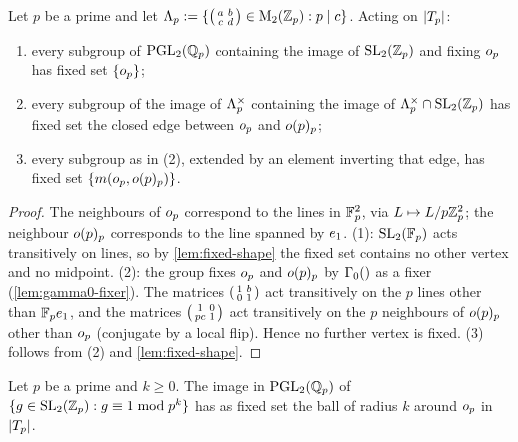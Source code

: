 \begin{lemma}
\label{lem:local-fixed-points}
Let $p$ be a prime and let $\Lambda_{p} := \{\left(\begin{smallmatrix} a & b \\ c & d \end{smallmatrix}\right)
\in \mathrm{M}_{2}(\mathbb{Z}_{p}) : p \mid c\}$. Acting on
$|T_{p}|$:
\begin{enumerate}
\item every subgroup of $\PGL{2}{\pAdicNumbers{p}}$ containing the image of
  $\SL{2}{\pAdicIntegers{p}}$ and fixing $o_{p}$ has fixed set
  $\{o_{p}\}$;
\item every subgroup of the image of $\Lambda_{p}^{\times}$ containing the
  image of $\unit{\IwahoriOrder{p}} \cap \SL{2}{\pAdicIntegers{p}}$ has fixed
  set the closed edge between $o_{p}$ and
  $o(p)_{p}$;
\item every subgroup as in (2), extended by an element inverting that
  edge, has fixed set $\{m(o_{p},o(p)_{p})\}$.
\end{enumerate}
\end{lemma}

\begin{proof}
The neighbours of $o_{p}$ correspond to the lines in
$\mathbb{F}_{p}^{2}$, via $L \mapsto L/p\mathbb{Z}_{p}^{2}$;
the neighbour $o(p)_{p}$ corresponds to the line spanned by
$e_{1}$. (1): $\SL{2}{\FF{p}}$ acts transitively on lines, so by
\cref{lem:fixed-shape} the fixed set contains no other vertex and no
midpoint. (2): the group fixes $o_{p}$ and $o(p)_{p}$
by $\GammaZero{}$ as a fixer (\cref{lem:gamma0-fixer}). The matrices
$\left(\begin{smallmatrix} 1 & b \\ 0 & 1 \end{smallmatrix}\right)$ act transitively on the $p$ lines other than
$\mathbb{F}_{p}e_{1}$, and the matrices $\left(\begin{smallmatrix} 1 & 0 \\ pc & 1 \end{smallmatrix}\right)$ act
transitively on the $p$ neighbours of $o(p)_{p}$ other than
$o_{p}$ (conjugate by a local flip). Hence no further vertex
is fixed. (3) follows from (2) and \cref{lem:fixed-shape}.
\end{proof}

\begin{lemma}
\label{lem:fixed-principal}
Let $p$ be a prime and $k \geq 0$. The image in $\PGL{2}{\pAdicNumbers{p}}$
of $\{g \in \SL{2}{\pAdicIntegers{p}} : g \equiv 1 \bmod p^{k}\}$ has as fixed
set the ball of radius $k$ around $o_{p}$ in
$|T_{p}|$.
\end{lemma}

